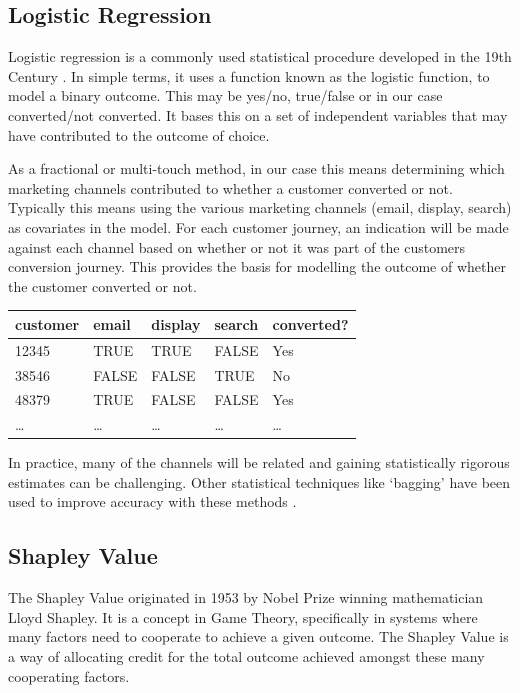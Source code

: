 \documentclass[]{book}
\begin{document}
\hypertarget{logistic-regression}{%
\subsection{Logistic Regression}\label{logistic-regression}}

Logistic regression is a commonly used statistical procedure developed in the
19th Century \citep{cramer2002origins}. In simple terms, it uses a function known as
the logistic function, to model a binary outcome. This may be yes/no, true/false
or in our case converted/not converted. It bases this on a set of independent
variables that may have contributed to the outcome of choice.

As a fractional or multi-touch method, in our case this means determining which
marketing channels contributed to whether a customer converted or not. Typically
this means using the various marketing channels (email, display, search) as covariates
in the model. For each customer journey, an indication will be made against each
channel based on whether or not it was part of the customers conversion journey.
This provides the basis for modelling the outcome of whether the customer converted or not.

\begin{longtable}[]{@{}lllll@{}}
\toprule
customer & email & display & search & converted?\tabularnewline
\midrule
\endhead
12345 & TRUE & TRUE & FALSE & Yes\tabularnewline
38546 & FALSE & FALSE & TRUE & No\tabularnewline
48379 & TRUE & FALSE & FALSE & Yes\tabularnewline
\ldots{} & \ldots{} & \ldots{} & \ldots{} & \ldots{}\tabularnewline
\bottomrule
\end{longtable}

In practice, many of the channels will be related and gaining statistically
rigorous estimates can be challenging. Other statistical techniques like
`bagging' have been used to improve accuracy with these methods \citep{shao2011data}.

\hypertarget{shapley-value}{%
\subsection{Shapley Value}\label{shapley-value}}

The Shapley Value \citep{shapley1953value} originated in 1953 by Nobel Prize winning
mathematician Lloyd Shapley. It is a concept in Game Theory, specifically in
systems where many factors need to cooperate to achieve a given outcome.
The Shapley Value is a way of allocating credit for the total outcome
achieved amongst these many cooperating factors.
\end{document}
